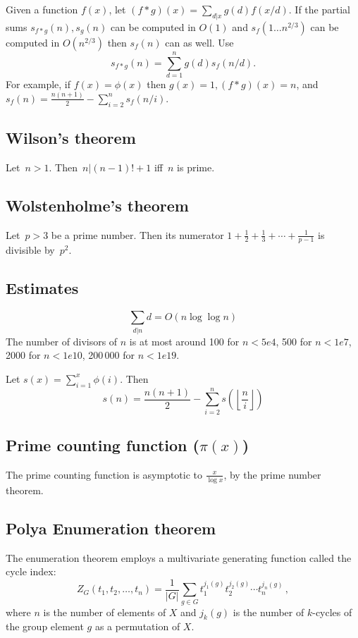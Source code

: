 Given a function $f(x)$, let $(f*g)(x)=\sum_{d|x}g(d)f(x/d)$. If the partial sums $s_{f*g}(n),s_g(n)$ can be computed in $O(1)$ and $s_f(1\ldots n^{2/3})$ can be computed in $O\left(n^{2/3}\right)$ then $s_f(n)$ can as well. Use
	$$s_{f*g}(n)=\sum_{d=1}^ng(d)s_f(n/d).$$ %
	For example, if $f(x)=\phi(x)$ then $g(x)=1, (f*g)(x)=n$, and $s_f(n)=\frac{n(n+1)}{2}-\sum_{i=2}^ns_f(n/i).$



\subsection{Wilson's theorem}
Let~$n > 1$. Then~$n|(n-1)!+1$ iff~$n$ is prime.

\subsection{Wolstenholme's theorem}
Let~$p > 3$ be a prime number. Then its numerator $ 1 + \frac{1}{2}+\frac{1}{3}+\cdots+\frac{1}{p-1} $
is divisible by~$p^2$.

\subsection{Estimates}
\[
	\sum_{d|n} d = O(n \log \log n)
\]
	The number of divisors of $n$ is at most around 100 for $n < 5e4$, 500 for $n < 1e7$, 2000 for $n < 1e10$, 200\,000 for $n < 1e19$.

	Let $s(x)=\sum_{i=1}^x\phi(i).$ Then 
	\[s(n)=\frac{n(n+1)}{2}-\sum_{i=2}^ns\left(\left\lfloor\frac{n}{i}\right\rfloor\right)\]
	
	
\subsection{Prime counting function ($\pi(x)$)} The prime counting function is asymptotic to $\frac{x}{\log x}$, by the prime number theorem.

\iffalse
\subsection{Polya Enumeration theorem}
The enumeration theorem employs a multivariate generating function called the cycle index:
$$Z_{G}(t_{1},t_{2},\ldots ,t_{n})={\frac {1}{|G|}}\sum _{g\in G}t_{1}^{j_{1}(g)}t_{2}^{j_{2}(g)}\cdots t_{n}^{j_{n}(g)}\,,$$
where $n$ is the number of elements of $X$ and $j_k(g)$ is the number of $k$-cycles of the group element $g$ as a permutation of $X$.

